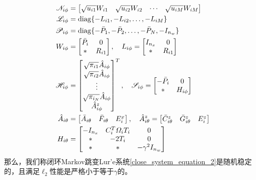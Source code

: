 	\begin{equation}\notag
	\begin{aligned}
	\mathscr{N}_{i\phi}&=\begin{bmatrix}
	\sqrt{u_{i1}}W_{i1}&\sqrt{u_{i2}}W_{i2}&\cdots&\sqrt{u_{iM}}W_{iM}
	\end{bmatrix}\\
	\mathscr{L}_{i\phi}&=\mathrm{diag} \{-L_{i1},-L_{i2},\dots,-L_{iM}  \}\\
	\mathscr{P}_{i\phi}&=\mathrm{diag}\{-\bar{P}_{1},-\bar{P}_{2},\dots,-\bar{P}_{N},-I_{n_w}  \}\\
	W_{i\phi}&=\begin{bmatrix}
	\bar{P}_{i}&0\\
	*&R_{i1}
	\end{bmatrix}, \quad
	L_{i\phi}=\begin{bmatrix}
	I_{n_x}&0\\
	*&R_{i1}
	\end{bmatrix}\\
	\mathscr{H}_{i\phi}&=\begin{bmatrix}
	\sqrt{\pi_{i1}}\hat{A}_{i\phi}\\
	\sqrt{\pi_{i2}}\hat{A}_{i\phi}\\
	\vdots\\
	\sqrt{\pi_{i_N}}\hat{A}_{i\phi}\\
	\hat{A}^{z}_{i\phi}
	\end{bmatrix}^{T}, \quad
	\mathscr{S}_{i\phi}=\begin{bmatrix}
	-\bar{P}_{i}&0\\
	*&H_{i\phi}
	\end{bmatrix}\\
	\hat{A}_{i\theta}&=\begin{bmatrix}
	\bar{A}_{i\theta}&\bar{F}_{i\theta}&E^{x}_{i}
	\end{bmatrix},\quad
	\hat{A}^{z}_{i\theta}=\begin{bmatrix}
	\bar{C}^{z}_{i\theta}&\bar{G}^{z}_{i\theta}&E^{z}_{i}
	\end{bmatrix}  \\
	H_{i\theta}&=\begin{bmatrix}
	-I_{n_x}&C^{T}_{i}\varOmega_{i}T_{i}&0\\
	*&-2T_{i}&0\\
	*&*&-\gamma^{2}I_{n_w}
	\end{bmatrix}
	\end{aligned}
	\end{equation}
	那么，我们称闭环Markov跳变Lur'e系统\eqref{close_system_equation_2}是随机稳定的，且满足$\ell_2$性能是严格小于等于$\gamma$的。
	
